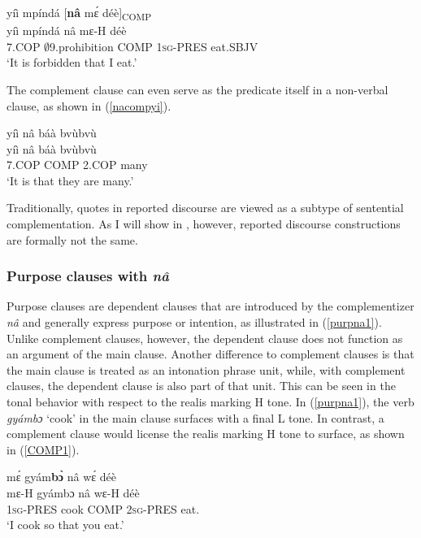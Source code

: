 \begin{exe}
\ex\label{BComp2} 
  \glll  yíì mpíndá [{\bfseries nâ} mɛ́ déè]\textsubscript{COMP} \\
         yíì mpíndá nâ mɛ-H déè \\
         7.COP  $\emptyset$9.prohibition COMP 1\textsc{sg}-PRES eat.SBJV \\ 
    \trans `It is forbidden that I eat.'
\end{exe}

The complement clause can even serve as the predicate itself in a non-verbal clause, as shown in (\ref{nacompyi}).

\begin{exe} 
\ex\label{nacompyi}
  \glll   yíì nâ báà bvùbvù \\
         yíì nâ báà bvùbvù \\
            7.COP COMP 2.COP many \\
    \trans `It is that they are many.'
\end{exe}

Traditionally, quotes in reported discourse are viewed as a subtype of sentential complementation. As I will show in  , however, reported discourse constructions are formally not the same.




\subsubsection{Purpose clauses with {\itshape nâ}}
\label{sec:Purposena}

Purpose clauses are dependent clauses that are introduced by the complementizer {\itshape nâ} and generally express purpose or intention, as illustrated  in (\ref{purpna1}). Unlike complement clauses, however, the dependent clause does not function as an argument of the main clause.  Another difference to complement clauses is that the main clause is treated as an intonation phrase unit, while, with complement clauses, the dependent clause is also part of that unit. This can be seen in the tonal behavior with respect to the realis marking H tone. In (\ref{purpna1}), the verb {\itshape gyámbɔ} `cook' in the main clause surfaces with a final L tone. In contrast,  a complement clause would license the realis marking H tone to surface, as shown in (\ref{COMP1}).

\begin{exe}
\ex\label{purpna1}
  \glll mɛ́ gyám{\bfseries bɔ̀} nâ wɛ́ déè\\
        mɛ-H gyámbɔ nâ wɛ-H déè\\
      1\textsc{sg}-PRES cook COMP 2\textsc{sg}-PRES eat.\\
    \trans `I cook so that you eat.'
\end{exe}


